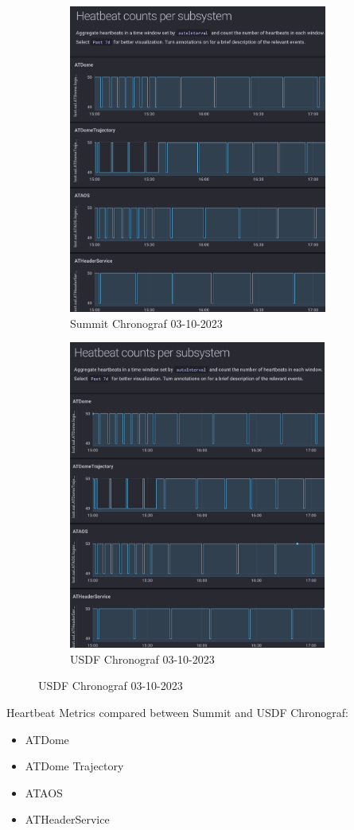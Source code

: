 \begin{figure}
\centering
\begin{subfigure}{.5\textwidth}
  \centering
  \includegraphics[height=4in]{images/Summit_1.png}
  \caption{Summit Chronograf 03-10-2023}
  \label{fig:sub1}
\end{subfigure}%
\begin{subfigure}{.5\textwidth}
  \centering
  \includegraphics[height=4in]{images/USDF_1.png}
  \caption{USDF Chronograf 03-10-2023}
  \label{fig:sub2}
\end{subfigure}
\label{fig:image1}
\end{figure}
Heartbeat Metrics compared between Summit and USDF Chronograf:
\begin{itemize}
  \item ATDome
  \item ATDome Trajectory
  \item ATAOS
  \item ATHeaderService
\end{itemize}

